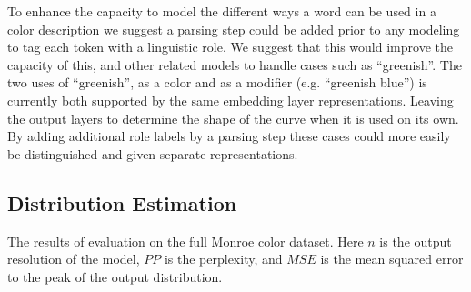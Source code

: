 \documentclass[11pt,letterpaper]{article}
\begin{document}
To enhance the capacity to model the different ways a word can be used in a color description we suggest a parsing step could be added prior to any modeling to tag each token with a linguistic role.
We suggest that this would improve the capacity of this, and other related models to handle cases such as ``greenish''.
The two uses of ``greenish'', as a color and as a modifier (e.g. ``greenish blue'') is currently both supported by the same embedding layer representations.
Leaving the output layers to determine the shape of the curve when it is used on its own.
By adding additional role labels by a parsing step these cases could more easily be distinguished and given separate representations.

\subsection{Distribution Estimation}

\begin{table*}
	\centering
	\caption{\label{tblresfull} The results of evaluation on the full Monroe color dataset. Here $n$ is the output resolution of the model, $PP$ is the perplexity, and $MSE$ is the mean squared error to the peak of the output distribution.}
\end{table*}
\end{document}
